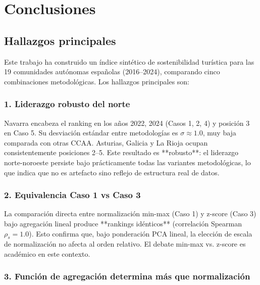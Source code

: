 
\chapter{Conclusiones}

\section{Hallazgos principales}

Este trabajo ha construido un índice sintético de sostenibilidad turística para las 19 comunidades autónomas españolas (2016--2024), comparando cinco combinaciones metodológicas. Los hallazgos principales son:

\subsection{1. Liderazgo robusto del norte}

Navarra encabeza el ranking en los años 2022, 2024 (Casos 1, 2, 4) y posición 3 en Caso 5. Su desviación estándar entre metodologías es $\sigma \approx 1.0$, muy baja comparada con otras CCAA. Asturias, Galicia y La Rioja ocupan consistentemente posiciones 2--5. Este resultado es **robusto**: el liderazgo norte-noroeste persiste bajo prácticamente todas las variantes metodológicas, lo que indica que no es artefacto sino reflejo de estructura real de datos.

\subsection{2. Equivalencia Caso 1 vs Caso 3}

La comparación directa entre normalización min-max (Caso 1) y z-score (Caso 3) bajo agregación lineal produce **rankings idénticos** (correlación Spearman $\rho_s = 1.0$). Esto confirma que, bajo ponderación PCA lineal, la elección de escala de normalización no afecta al orden relativo. El debate min-max vs. z-score es académico en este contexto.

\subsection{3. Función de agregación determina más que normalización}

